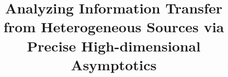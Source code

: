 \documentclass{article}
\begin{document}
	\title{Analyzing Information Transfer from Heterogeneous Sources via Precise High-dimensional Asymptotics}
	

	\maketitle
	
	
	
	
	
    
	
	
	
\end{document}
